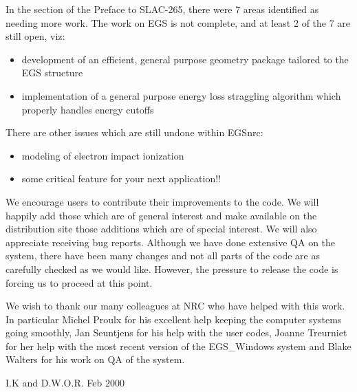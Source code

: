 In the section of the Preface to SLAC-265, there were 7 areas identified as
needing more work.  The work on EGS is not  complete, and at least 2 of
the 7 are still open, viz:
\begin{itemize} 
\vspace{-4mm}
\item development of an efficient, general purpose geometry package
tailored to the EGS structure
\vspace{-3mm}
\item implementation of a general purpose energy loss straggling algorithm
which properly handles energy cutoffs
\end{itemize} 

\vspace{-5mm}
There are other issues which are still undone within EGSnrc:
\vspace{-5mm}
\begin{itemize} 
\item modeling of electron impact ionization
\vspace{-3mm}
\item some critical feature for your next application!!
\end{itemize} 
We encourage users to contribute their improvements to the code. We will
happily add those which are of general interest and make available on the
distribution site those additions which are of special interest. We will
also appreciate receiving bug reports. Although we have done extensive QA
on the system, there have been many changes and not all parts of the code
are as carefully checked as we would like.  However, the pressure to release
the code is forcing us to proceed at this point.

We wish to thank our many colleagues at NRC who have helped with this work.
In particular Michel Proulx for his excellent help keeping the computer
systems going smoothly, Jan Seuntjens for his help with the user codes,
Joanne Treurniet for her help with the most recent version of the
EGS\_Windows system and Blake Walters for his work on QA of the system.

\noindent I.K and D.W.O.R.  \hfill Feb 2000 \vspace{1mm}\\

